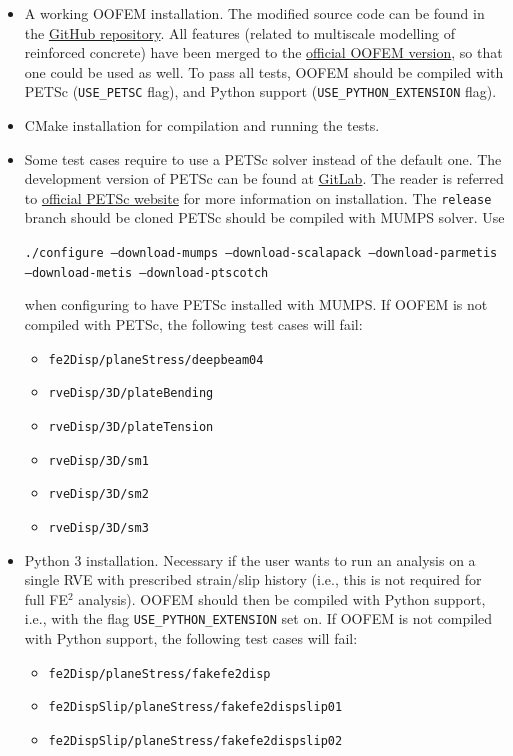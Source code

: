 \documentclass[11pt]{article}
\begin{document}
\begin{itemize}
    \item A working OOFEM installation. The modified source code can be found in the \href{https://github.com/adsci/oofem}{GitHub repository}. All features (related to multiscale modelling of reinforced concrete) have been merged to the \href{https://github.com/oofem/oofem}{official OOFEM version}, so that one could be used as well. To pass all tests, OOFEM should be compiled with PETSc (\texttt{USE\_PETSC} flag), and Python support (\texttt{USE\_PYTHON\_EXTENSION} flag).

    \item CMake installation for compilation and running the tests.

    \item Some test cases require to use a PETSc solver instead of the default one. The development version of PETSc can be found at \href{https://gitlab.com/petsc/petsc}{GitLab}. The reader is referred to \href{https://www.mcs.anl.gov/petsc/}{official PETSc website} for more information on installation. The \texttt{release} branch should be cloned PETSc should be compiled with MUMPS solver. Use 

    \texttt{./configure --download-mumps --download-scalapack --download-parmetis --download-metis --download-ptscotch} 
    
    when configuring to have PETSc installed with MUMPS. If OOFEM is not compiled with PETSc, the following test cases will fail:
    \begin{itemize}
        \item \texttt{fe2Disp/planeStress/deepbeam04}
        \item \texttt{rveDisp/3D/plateBending}
        \item \texttt{rveDisp/3D/plateTension}
        \item \texttt{rveDisp/3D/sm1}
        \item \texttt{rveDisp/3D/sm2}
        \item \texttt{rveDisp/3D/sm3}
    \end{itemize}


    \item Python 3 installation. Necessary if the user wants to run an analysis on a single RVE with prescribed strain/slip history (i.e., this is not required for full FE$^2$ analysis). OOFEM should then be compiled with Python support, i.e., with the flag \texttt{USE\_PYTHON\_EXTENSION} set on. If OOFEM is not compiled with Python support, the following test cases will fail:
    \begin{itemize}
        \item \texttt{fe2Disp/planeStress/fakefe2disp}
        \item \texttt{fe2DispSlip/planeStress/fakefe2dispslip01}
        \item \texttt{fe2DispSlip/planeStress/fakefe2dispslip02}
    \end{itemize}


\end{itemize}
\end{document}
